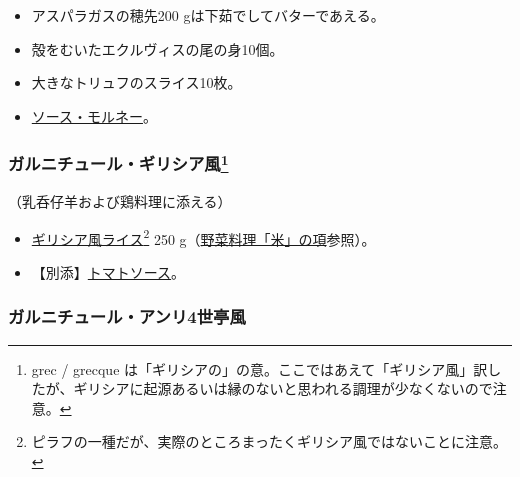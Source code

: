 \begin{recette}
\begin{itemize}
\item
  アスパラガスの穂先200 gは下茹でしてバターであえる。
\item
  殻をむいたエクルヴィスの尾の身10個。
\item
  大きなトリュフのスライス10枚。
\item
  \protect\hyperlink{sauce-mornay}{ソース・モルネー}。
\end{itemize}

\atoaki{}

\hypertarget{garniture-a-la-grecque}{%
\subsubsection[ガルニチュール・ギリシア風]{\texorpdfstring{ガルニチュール・ギリシア風\footnote{grec
  / grecque
  は「ギリシアの」の意。ここではあえて「ギリシア風」訳したが、ギリシアに起源あるいは縁のないと思われる調理が少なくないので注意。}}{ガルニチュール・ギリシア風}}\label{garniture-a-la-grecque}}



（乳呑仔羊および鶏料理に添える）

\begin{itemize}
\item
  \protect\hyperlink{riz-a-la-grecque}{ギリシア風ライス}\footnote{ピラフの一種だが、実際のところまったくギリシア風ではないことに注意。}
  250 g（\protect\hyperlink{riz}{野菜料理「米」の項}参照）。
\item
  【別添】\protect\hyperlink{sauce-tomate}{トマトソース}。
\end{itemize}

\atoaki{}

\hypertarget{garniture-henri-iv}{%
\subsubsection{ガルニチュール・アンリ4世亭風}\label{garniture-henri-iv}}




\end{recette}
